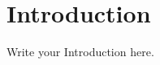 \documentclass[12pt,a4paper,notitlepage]{report}
\begin{document}
\section*{Introduction}
Write your Introduction here.


\renewcommand\bibname{References} %


\end{document}
